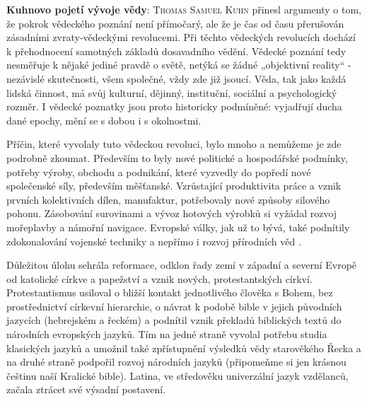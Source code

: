     \begin{mdframed}[style=mdnote]
      \begin{note}
        \textbf{Kuhnovo pojetí vývoje vědy}: \textsc{Thomas Samuel Kuhn} přinesl argumenty o tom, že
        pokrok vědeckého poznání není přímočarý, ale že je čas od času přerušován zásadními
        zvraty-vědeckými revolucemi. Při těchto vědeckých revolucích dochází k přehodnocení
        samotných základů dosavadního vědění. Vědecké poznání tedy nesměřuje k nějaké jediné pravdě
        o světě, netýká se žádné „objektivní reality“ - nezávislé skutečnosti, všem společné, vždy
        zde již jsoucí. Věda, tak jako každá lidská činnost, má svůj kulturní, dějinný, instituční,
        sociální a psychologický rozměr. I vědecké poznatky jsou proto historicky podmíněné:
        vyjadřují ducha dané epochy, mění se s dobou i s okolnostmi.

        {\centering
        \captionsetup{type=figure} 
        \label{fyz:fig893}
      \par}
      \end{note}
    \end{mdframed}

    Příčin, které vyvolaly tuto vědeckou revoluci, bylo mnoho a nemůžeme je zde podrobně zkoumat.
    Především to byly nové politické a hospodářské podmínky, potřeby výroby, obchodu a podnikání,
    které vyzvedly do popředí nové společenské síly, především měšťanské. Vzrůstající produktivita
    práce a vznik prvních kolektivních dílen, manufaktur, potřebovaly nové způsoby silového pohonu.
    Zásobování surovinami a vývoz hotových výrobků si vyžádal rozvoj mořeplavby a námořní navigace.
    Evropské války, jak už to bývá, také podnítily zdokonalování vojenské techniky a nepřímo i
    rozvoj přírodních věd \cite[s.~137]{Stoll2009}.

    Důležitou úlohu sehrála reformace, odklon řady zemí v západní a severní Evropě od katolické
    církve a papežství a vznik nových, protestantských církví. Protestantismus usiloval o bližší
    kontakt jednotlivého člověka s Bohem, bez prostřednictví církevní hierarchie, o návrat k podobě
    bible v jejich původních jazycích (hebrejském a řeckém) a podnítil vznik překladů biblických
    textů do národních evropských jazyků. Tím na jedné straně vyvolal potřebu studia klasických
    jazyků a umožnil také zpřístupnění výsledků vědy starověkého Řecka a na druhé straně podpořil
    rozvoj národních jazyků (připomeňme si jen krásnou češtinu naší Kralické bible). Latina, ve
    středověku univerzální jazyk vzdělanců, začala ztrácet své výsadní postavení.

